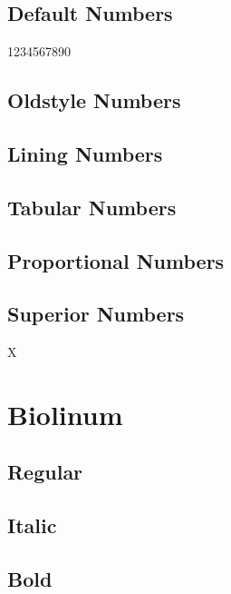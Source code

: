 \documentclass{article}
\begin{document}
\subsection*{Default Numbers}

1234567890

\subsection*{Oldstyle Numbers}


\subsection*{Lining Numbers}


\subsection*{Tabular Numbers}


\subsection*{Proportional Numbers}


\subsection*{Superior Numbers}

X


\clearpage
\section{Biolinum}\sf

\subsection*{Regular}
\lipsum[1]


\subsection*{Italic}
\textit{\lipsum[2]}

\subsection*{Bold}
\textbf{\lipsum[3]}
\end{document}
